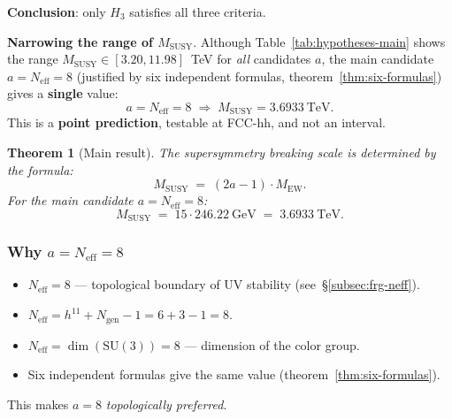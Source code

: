 \documentclass[11pt,a4paper]{article}
\newcommand{\SU}{\ensuremath{\mathrm{SU}}}
\newtheorem{theorem}{Theorem}[section]
\theoremstyle{definition}
\begin{document}
\medskip\noindent
\textbf{Conclusion}: only $H_3$ satisfies all three criteria.

\medskip\noindent
\textbf{Narrowing the range of $M_{\text{SUSY}}$}.
Although Table~\ref{tab:hypotheses-main} shows the range
$M_{\text{SUSY}} \in [3.20, 11.98]$~TeV for \emph{all}
candidates $a$, the main candidate $a = N_{\text{eff}} = 8$
(justified by six independent formulas,
theorem~\ref{thm:six-formulas}) gives a \textbf{single}
value:
\begin{equation}
    \boxed{
    a = N_{\text{eff}} = 8
    \;\Rightarrow\;
    M_{\text{SUSY}} = 3.6933~\text{TeV}.
    }
    \label{eq:MSUSY-narrowed}
\end{equation}
This is a \textbf{point prediction}, testable at FCC-hh,
and not an interval.

\begin{theorem}[Main result]
\label{thm:MSUSY-main}
The supersymmetry breaking scale is determined by the formula:
\begin{equation}
    \boxed{
    M_{\text{SUSY}} \;=\; (2a - 1) \cdot M_{\text{EW}}.
    }
    \label{eq:MSUSY-H3}
\end{equation}
For the main candidate $a = N_{\text{eff}} = 8$:
\begin{equation}
    \boxed{
    M_{\text{SUSY}} \;=\; 15 \cdot 246.22~\text{GeV}
    \;=\; 3.6933~\text{TeV}.
    }
    \label{eq:MSUSY-final}
\end{equation}
\end{theorem}

\subsubsection{Why \texorpdfstring{$a = N_{\text{eff}} = 8$}{a = N\_eff = 8}}

\begin{itemize}
    \item $N_{\text{eff}} = 8$ --- topological boundary
          of UV stability (see~\S\ref{subsec:frg-neff}).
    \item $N_{\text{eff}} = h^{11} + N_{\text{gen}} - 1 = 6 + 3 - 1 = 8$.
    \item $N_{\text{eff}} = \dim(\SU(3)) = 8$ --- dimension
          of the color group.
    \item Six independent formulas give the same value
          (theorem~\ref{thm:six-formulas}).
\end{itemize}

\medskip\noindent
This makes $a = 8$ \emph{topologically preferred}.
\end{document}
